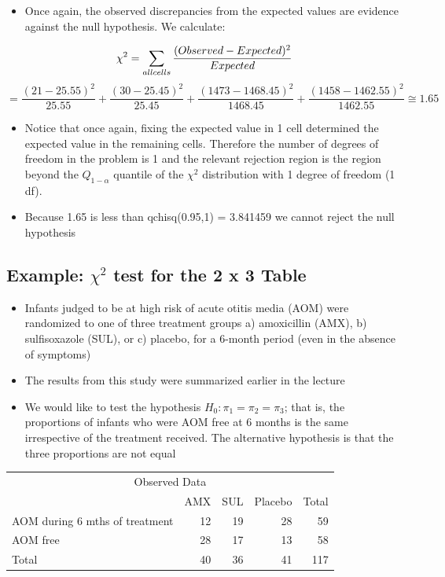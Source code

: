 \documentclass[
]{book}
\providecommand{\tightlist}{%
  \setlength{\itemsep}{0pt}\setlength{\parskip}{0pt}}
\begin{document}
\begin{itemize}
\tightlist
\item
  Once again, the observed discrepancies from the expected values are evidence against the null hypothesis. We calculate:
\end{itemize}

\[\chi^2=\sum_{all\space cells}\frac{(Observed-Expected)^2}{Expected}\]
\[=\frac{(21-25.55)^2}{25.55}+\frac{(30-25.45)^2}{25.45}+\frac{(1473-1468.45)^2}{1468.45}+\frac{(1458-1462.55)^2}{1462.55}\cong1.65\]

\begin{itemize}
\tightlist
\item
  Notice that once again, fixing the expected value in 1 cell determined the expected value in the remaining cells. Therefore the number of degrees of freedom in the problem is 1 and the relevant rejection region is the region beyond the \(Q_{1-α}\) quantile of the \(\chi^2\) distribution with 1 degree of freedom (1 df).\\
\item
  Because 1.65 is less than qchisq(0.95,1) = 3.841459 we cannot reject the null hypothesis
\end{itemize}

\hypertarget{example-chi2-test-for-the-2-x-3-table}{%
\subsection{\texorpdfstring{Example: \(\chi^2\) test for the 2 x 3 Table}{Example: \textbackslash chi\^{}2 test for the 2 x 3 Table}}\label{example-chi2-test-for-the-2-x-3-table}}

\begin{itemize}
\tightlist
\item
  Infants judged to be at high risk of acute otitis media (AOM) were randomized to one of three treatment groups a) amoxicillin (AMX), b) sulfisoxazole (SUL), or c) placebo, for a 6-month period (even in the absence of symptoms)
\item
  The results from this study were summarized earlier in the lecture
\item
  We would like to test the hypothesis \(H_0:\pi_1=\pi_2=\pi_3\); that is, the proportions of infants who were AOM free at 6 months is the same irrespective of the treatment received. The alternative hypothesis is that the three proportions are not equal
\end{itemize}

\begin{table}
\centering
\begin{tabular}{l|r|r|r|r}
\hline
\multicolumn{5}{c}{Observed Data} \\
\cline{1-5}
  & AMX & SUL & Placebo & Total\\
\hline
AOM during 6 mths of treatment & 12 & 19 & 28 & 59\\
\hline
AOM free & 28 & 17 & 13 & 58\\
\hline
Total & 40 & 36 & 41 & 117\\
\hline
\end{tabular}
\end{table}
\end{document}
